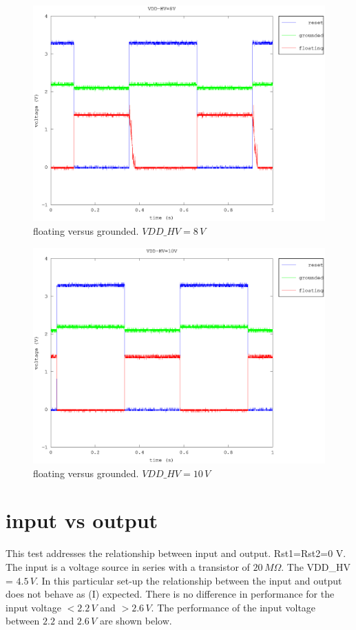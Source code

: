 \documentclass{article}
\begin{document}
\begin{figure}[H]
	\centering
	\includegraphics[width=0.8\linewidth]{fig/g_f_8V.eps}
	\caption{floating versus grounded. $VDD\_HV=8\,V$}
	\label{fig:g_f_8V}
\end{figure}

\begin{figure}[H]
	\centering
	\includegraphics[width=0.8\linewidth]{fig/g_f_10V.eps}
	\caption{floating versus grounded. $VDD\_HV=10\,V$}
	\label{fig:g_f_10V}
\end{figure}

\section{input vs output}
This test addresses the relationship between input and output. Rst1=Rst2=0 V. The input is a voltage source in series with a transistor of $20\,M\Omega$. The VDD\_HV = $4.5\,V$. In this particular set-up the relationship between the input and output does not behave as (I) expected. There is no difference in performance for the input voltage $<2.2\,V$ and $>2.6\,V$. The performance of the input voltage between $2.2$ and $2.6\,V$ are shown below. 
\end{document}
